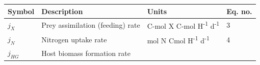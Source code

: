 \documentclass[]{elsarticle} %
\begin{document}
\begin{longtable}[c]{@{}llll@{}}
\toprule
\begin{minipage}[b]{0.10\columnwidth}\raggedright\strut
Symbol
\strut\end{minipage} &
\begin{minipage}[b]{0.45\columnwidth}\raggedright\strut
Description
\strut\end{minipage} &
\begin{minipage}[b]{0.27\columnwidth}\raggedright\strut
Units
\strut\end{minipage} &
\begin{minipage}[b]{0.10\columnwidth}\raggedright\strut
Eq. no.
\strut\end{minipage}\tabularnewline
\midrule
\endhead
\begin{minipage}[t]{0.10\columnwidth}\raggedright\strut
\(j_X\)
\strut\end{minipage} &
\begin{minipage}[t]{0.45\columnwidth}\raggedright\strut
Prey assimilation (feeding) rate
\strut\end{minipage} &
\begin{minipage}[t]{0.27\columnwidth}\raggedright\strut
C-mol X C-mol H\textsuperscript{-1} d\textsuperscript{-1}
\strut\end{minipage} &
\begin{minipage}[t]{0.10\columnwidth}\raggedright\strut
3
\strut\end{minipage}\tabularnewline
\begin{minipage}[t]{0.10\columnwidth}\raggedright\strut
\(j_N\)
\strut\end{minipage} &
\begin{minipage}[t]{0.45\columnwidth}\raggedright\strut
Nitrogen uptake rate
\strut\end{minipage} &
\begin{minipage}[t]{0.27\columnwidth}\raggedright\strut
mol N Cmol H\textsuperscript{-1} d\textsuperscript{-1}
\strut\end{minipage} &
\begin{minipage}[t]{0.10\columnwidth}\raggedright\strut
4
\strut\end{minipage}\tabularnewline
\begin{minipage}[t]{0.10\columnwidth}\raggedright\strut
\(j_{HG}\)
\strut\end{minipage} &
\begin{minipage}[t]{0.45\columnwidth}\raggedright\strut
Host biomass formation rate
\strut\end{minipage} &

\end{longtable}
\end{document}
